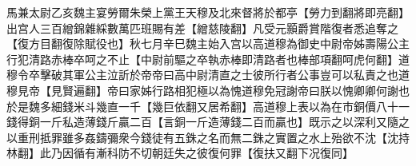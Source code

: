 馬兼太尉乙亥魏主宴勞爾朱榮上黨王天穆及北來督將於都亭【勞力到翻將即亮翻】出宫人三百繒錦雜綵數萬匹班賜有差【繒慈陵翻】凡受元顥爵賞階復者悉追奪之【復方目翻復除賦役也】秋七月辛巳魏主始入宫以高道穆為御史中尉帝姊壽陽公主行犯清路赤棒卒呵之不止【中尉前驅之卒執赤棒即清路者也棒部項翻呵虎何翻】道穆令卒擊破其軍公主泣訢於帝帝曰高中尉清直之士彼所行者公事豈可以私責之也道穆見帝【見賢遍翻】帝曰家姊行路相犯極以為愧道穆免冠謝帝曰朕以愧卿卿何謝也於是魏多細錢米斗幾直一千【幾巨依翻又居希翻】高道穆上表以為在市銅價八十一錢得銅一斤私造薄錢斤贏二百【言銅一斤造薄錢二百而贏也】既示之以深利又隨之以重刑抵罪雖多姦鑄彌衆今錢徒有五銖之名而無二銖之實置之水上殆欲不沈【沈持林翻】此乃因循有漸科防不切朝廷失之彼復何罪【復扶又翻下况復同】